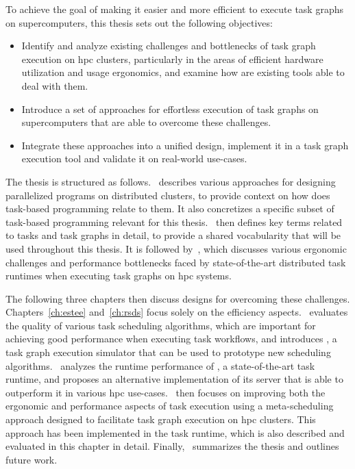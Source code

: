 To achieve the goal of making it easier and more efficient to execute task graphs on
supercomputers, this thesis sets out the following objectives:

\begin{itemize}
	\item Identify and analyze existing challenges and bottlenecks of task graph execution on
	      \gls{hpc} clusters, particularly in the areas of efficient hardware utilization and
	      usage ergonomics, and examine how are existing tools able to deal with them.
	\item Introduce a set of approaches for effortless execution of task graphs on supercomputers that are
	      able to overcome these challenges.
	\item Integrate these approaches into a unified design, implement it in a task graph
		  execution tool and validate it on real-world use-cases.
\end{itemize}

The thesis is structured as follows.~ describes various approaches for
designing parallelized programs on distributed clusters, to provide context on how does task-based
programming relate to them. It also concretizes a specific subset of task-based programming
relevant for this thesis.~ then defines key terms related to tasks and task
graphs in detail, to provide a shared vocabularity that will be used throughout this thesis. It is
followed by~, which discusses various ergonomic challenges and performance
bottlenecks faced by state-of-the-art distributed task runtimes when executing task graphs on
\gls{hpc} systems.

The following three chapters then discuss designs for overcoming these challenges.
Chapters~\ref{ch:estee} and~\ref{ch:rsds} focus solely on the efficiency
aspects.~ evaluates the quality of various task scheduling algorithms, which
are important for achieving good performance when executing task workflows, and introduces
\estee{}, a task graph execution simulator that can be used to prototype new
scheduling algorithms.~ analyzes the runtime performance of
\dask{}, a state-of-the-art task runtime, and proposes an alternative implementation
of its server that is able to outperform it in various \gls{hpc}
use-cases.~ then focuses on improving both the ergonomic and performance
aspects of task execution using a meta-scheduling approach designed to facilitate task graph
execution on \gls{hpc} clusters. This approach has been implemented in the
\hyperqueue{} task runtime, which is also described and evaluated in this chapter in
detail. Finally,~ summarizes the thesis and outlines future work.

